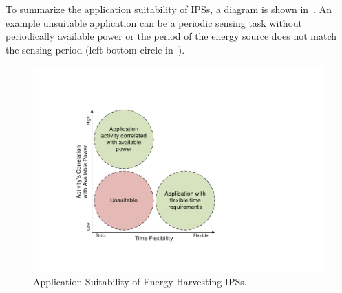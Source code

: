 To summarize the application suitability of IPSs, a diagram is shown in~. 
An example unsuitable application can be a periodic sensing task without periodically available power or the period of the energy source does not match the sensing period (left bottom circle in~).

\begin{figure}[!htb]
  \centering
  \includegraphics[width=0.7\columnwidth]{ch1_intro/figures/appsuit2}
  \caption{Application Suitability of Energy-Harvesting IPSs.}
  \label{Figure:appsuit}
\end{figure}



